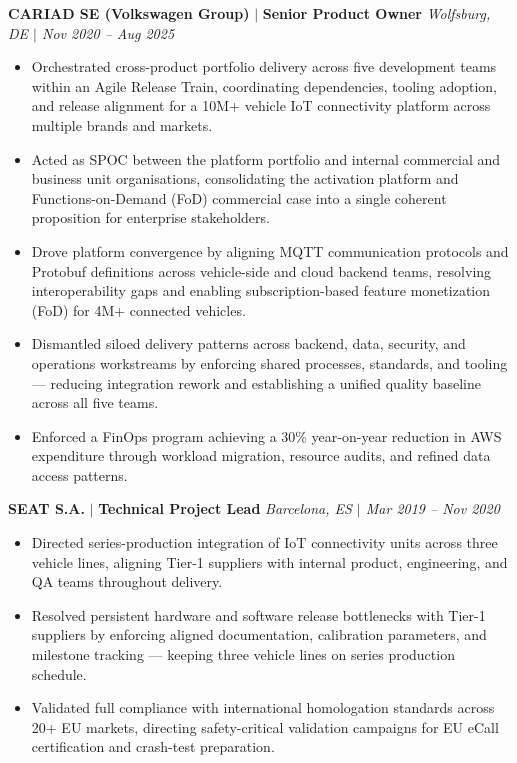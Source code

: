 \documentclass[a4paper,10pt]{article}
\begin{document}
\vspace{5pt}
\textbf{CARIAD SE (Volkswagen Group)} $|$ \textbf{Senior Product Owner} \hfill \textit{Wolfsburg, DE $|$ Nov 2020 -- Aug 2025}
\begin{itemize}
\item Orchestrated cross-product portfolio delivery across five development teams within an Agile Release Train, coordinating dependencies, tooling adoption, and release alignment for a 10M+ vehicle IoT connectivity platform across multiple brands and markets.
\item Acted as SPOC between the platform portfolio and internal commercial and business unit organisations, consolidating the activation platform and Functions-on-Demand (FoD) commercial case into a single coherent proposition for enterprise stakeholders.
\item Drove platform convergence by aligning MQTT communication protocols and Protobuf definitions across vehicle-side and cloud backend teams, resolving interoperability gaps and enabling subscription-based feature monetization (FoD) for 4M+ connected vehicles.
\item Dismantled siloed delivery patterns across backend, data, security, and operations workstreams by enforcing shared processes, standards, and tooling --- reducing integration rework and establishing a unified quality baseline across all five teams.
\item Enforced a FinOps program achieving a 30\% year-on-year reduction in AWS expenditure through workload migration, resource audits, and refined data access patterns.
\end{itemize}

\vspace{5pt}
\textbf{SEAT S.A.} $|$ \textbf{Technical Project Lead} \hfill \textit{Barcelona, ES $|$ Mar 2019 -- Nov 2020}
\begin{itemize}
\item Directed series-production integration of IoT connectivity units across three vehicle lines, aligning Tier-1 suppliers with internal product, engineering, and QA teams throughout delivery.
\item Resolved persistent hardware and software release bottlenecks with Tier-1 suppliers by enforcing aligned documentation, calibration parameters, and milestone tracking --- keeping three vehicle lines on series production schedule.
\item Validated full compliance with international homologation standards across 20+ EU markets, directing safety-critical validation campaigns for EU eCall certification and crash-test preparation.
\end{itemize}
\end{document}
